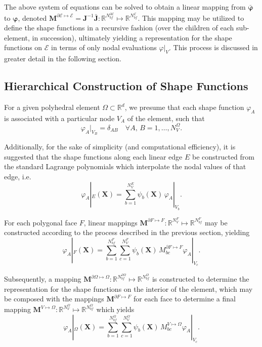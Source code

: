 	The above system of equations can be solved to obtain a linear mapping from $\bar{\boldsymbol{\varphi}}$ to $\boldsymbol{\varphi}$, denoted $\mathbf{M}^{\partial \mathcal{E} \mapsto \mathcal{E}} = \mathbf{J}^{-1} \bar{\mathbf{J}} : \mathbb{R}^{N^{\partial \mathcal{E}}_{bf}} \mapsto \mathbb{R}^{N^{\mathcal{E}}_{bf}}$. This mapping may be utilized to define the shape functions in a recursive fashion (over the children of each sub-element, in succession), ultimately yielding a representation for the shape functions on $\mathcal{E}$ in terms of only nodal evaluations $\varphi|_{V}$. This process is discussed in greater detail in the following section.
	
\subsection*{Hierarchical Construction of Shape Functions}

	For a given polyhedral element $\Omega \subset \mathbb{R}^d$, we presume that each shape function $\varphi_A$ is associated with a particular node $V_A$ of the element, such that
	\begin{equation}
		\varphi_A |_{V_B} = \delta_{AB} \quad \forall A, \, B = 1, \ldots, N^{\Omega}_V.
	\end{equation}
	
	Additionally, for the sake of simplicity (and computational efficiency), it is suggested that the shape functions along each linear edge $E$ be constructed from the standard Lagrange polynomials which interpolate the nodal values of that edge, i.e.
	\begin{equation}
		\varphi_A |_{E} (\mathbf{X}) = \sum_{b = 1}^{N^E_V} \psi_b (\mathbf{X}) \, \varphi_A |_{V_b}.
	\end{equation}

	For each polygonal face $F$, linear mappings $\mathbf{M}^{\partial F \mapsto F} : \mathbb{R}^{N^{F}_{V}} \mapsto \mathbb{R}^{N^{F}_{bf}}$ may be constructed according to the process described in the previous section, yielding 
	\begin{equation}
		\varphi_A |_{F} (\mathbf{X}) = \sum_{b = 1}^{N^F_{bf}} \sum_{c = 1}^{N^F_{V}} \psi_b (\mathbf{X}) \, M^{\partial F \mapsto F}_{bc} \varphi_A |_{V_c}.
	\end{equation}

	Subsequently, a mapping $\mathbf{M}^{\partial \Omega \mapsto \Omega} : \mathbb{R}^{N^{\partial \Omega}_{bf}} \mapsto \mathbb{R}^{N^{\Omega}_{bf}}$ is constructed to determine the representation for the shape functions on the interior of the element, which may be composed with the mappings $\mathbf{M}^{\partial F \mapsto F}$ for each face to determine a final mapping $\mathbf{M}^{V \mapsto \Omega} : \mathbb{R}^{N^{\Omega}_{V}} \mapsto \mathbb{R}^{N^{\Omega}_{bf}}$ which yields
	\begin{equation}
		\varphi_A |_{\Omega} (\mathbf{X}) = \sum_{b = 1}^{N^\Omega_{bf}} \sum_{c = 1}^{N^\Omega_{V}} \psi_b (\mathbf{X}) \, M^{V \mapsto \Omega}_{bc} \varphi_A |_{V_c}.
		\label{eq:mapped_shape_functions}
	\end{equation}

